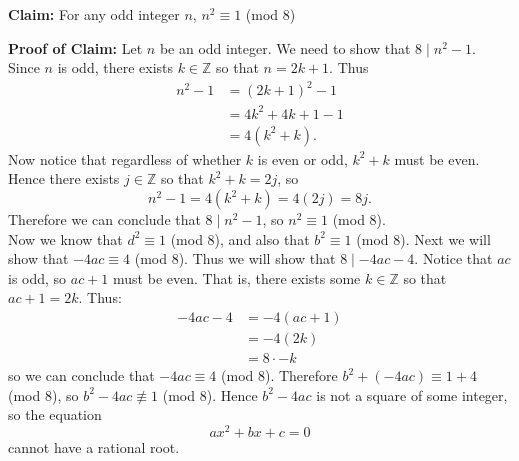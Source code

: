 \documentclass{article}
\begin{document}
\textbf{Claim:} For any odd integer $n$, $n^2 \equiv 1$ (mod 8)

\textbf{Proof of Claim:} Let $n$ be an odd integer. We need to show that $8 \mid n^2-1$. Since $n$ is odd, there exists $k \in \mathbb{Z}$ so that $n=2k+1$. Thus
\[
	\begin{split}
	n^2-1&=(2k+1)^2-1\\
		&=4k^2+4k+1-1\\
		&=4(k^2+k).
	\end{split}
\]
Now notice that regardless of whether $k$ is even or odd, $k^2+k$ must be even. Hence there exists $j \in \mathbb{Z}$ so that $k^2+k=2j$, so $$n^2-1=4(k^2+k)=4(2j)=8j.$$
Therefore we can conclude that $8 \mid n^2-1$, so $n^2 \equiv 1$ (mod 8).\\

Now we know that $d^2 \equiv 1$ (mod 8), and also that $b^2 \equiv 1$ (mod 8). Next we will show that $-4ac \equiv 4$ (mod 8). Thus we will show that $8 \mid -4ac-4$. Notice that $ac$ is odd, so $ac+1$ must be even. That is, there exists some $k \in \mathbb{Z}$ so that $ac+1=2k$. Thus:
\[
	\begin{split}
	-4ac-4&=-4(ac+1)\\
		&=-4(2k)\\
		&=8 \cdot -k
	\end{split}
\]
so we can conclude that $-4ac \equiv 4$ (mod 8). Therefore $b^2+(-4ac) \equiv 1+4$ (mod 8), so $b^2-4ac \not \equiv 1$ (mod 8). Hence $b^2-4ac$ is not a square of some integer, so the equation $$ax^2+bx+c=0$$
cannot have a rational root.
\end{document}
